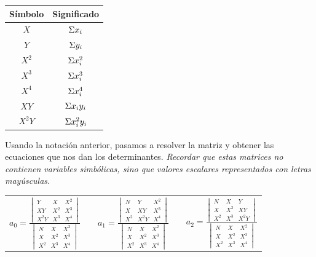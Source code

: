 \documentclass[11pt,letterpaper]{article}
\begin{document}
 \begin{table}[H]
 \centering
	\begin{tabular}{ c | c }
	\hline
	Símbolo & Significado  \\ \hline
	$X$ &	$\mathlarger{\Sigma} x_i$  \\ 
	$Y$ &   $\mathlarger{\Sigma} y_i$ \\
	$X^2$ & $\mathlarger{\Sigma} x_i^2$ \\
	$X^3$ & $\mathlarger{\Sigma }x_i^3$ \\ 
	$X^4$ & $\mathlarger{\Sigma} x_i^4$ \\
	$XY$ &  $\mathlarger{\Sigma} x_i y_i$	\\
	$X^2Y$& $\mathlarger{\Sigma} x^2_i y_i$	\\ \hline
	\end{tabular}
	\label{table:simbologia}
\end{table}

Usando la notación anterior, pasamos a resolver la matriz y obtener las ecuaciones que nos dan los determinantes. \emph{Recordar que estas matrices no contienen variables simbólicas, sino que valores escalares representados con letras mayúsculas.}
\begin{table}[H] \centering \begin{tabular}{c c c c c}
$a_0 = \frac{
		\begin{vmatrix}
		 	Y &	X	& X^2 \\
		 	XY &	X^2	& X^3 \\
		 	X^2Y & X^3 & X^4	 
		\end{vmatrix}}
		{\begin{vmatrix}
		 	N &	X	& X^2 \\
		 	X &	X^2	& X^3 \\
		 	X^2 & X^3 & X^4	 
		\end{vmatrix}}
		
$ & &
$ a_1 = \frac{
		\begin{vmatrix}
		 	N &	Y	& X^2 \\
		 	X &	XY	& X^3 \\
		 	X^2 & X^2Y & X^4 
		\end{vmatrix}}
		{\begin{vmatrix}
		 	N &	X	& X^2 \\
		 	X &	X^2	& X^3 \\
		 	X^2 & X^3 & X^4	 
		\end{vmatrix}}
$ & &
$ a_2 = \frac{
		\begin{vmatrix}
		 	N &	X	& Y \\
		 	X &	X^2	& XY \\
		 	X^2 & X^3 & X^2Y 
		\end{vmatrix}}
		{\begin{vmatrix}
		 	N &	X	& X^2 \\
		 	X &	X^2	& X^3 \\
		 	X^2 & X^3 & X^4	 
		\end{vmatrix}}
$ \\
\end{tabular} \end{table}
\end{document}
